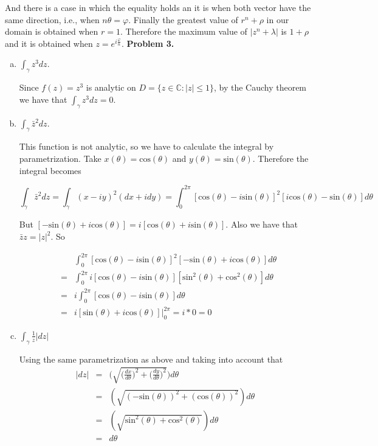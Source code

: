 \documentclass[letterpaper,twoside,11pt]{article}
\begin{document}
And there is a case in which the equality holds an it is when both vector have the same direction, i.e., when $n\theta=\varphi$. Finally the greatest value of $r^n+\rho$ in our domain is obtained when $r=1$. Therefore the maximum value of $|z^n+\lambda|$ is $1+\rho$ and it is obtained when $z=e^{i\frac{\varphi}{n}}$. 
\newpage
\textbf{Problem 3.}
\begin{enumerate}[a)]
\item $\int_{\gamma} z^3dz$. 

Since $f(z)=z^3$ is analytic on $D=\{z \in \mathbb{C}:|z|\leq 1\}$, by the Cauchy theorem we have that $\int_{\gamma} z^3dz = 0$.

\item $\int_{\gamma} \bar{z}^2dz$. 

This function is not analytic, so we have to calculate the integral by parametrization. Take $x(\theta)=\text{cos}(\theta)$ and $y(\theta)=\text{sin}(\theta)$. Therefore the integral becomes

\begin{equation}
\int_{\gamma} \bar{z}^2dz = \int_{\gamma} (x-iy)^2(dx+idy) = \int_{0}^{2\pi} [\text{cos}(\theta)-i\text{sin}(\theta)]^2[i\text{cos}(\theta)-\text{sin}(\theta)]d\theta \nonumber
\end{equation}

But $[-\text{sin}(\theta)+i\text{cos}(\theta)]=i[\text{cos}(\theta)+i\text{sin}(\theta)]$. Also we have that $\bar{z}z=|z|^2$. So

\begin{eqnarray}
&& \int_{0}^{2\pi} [\text{cos}(\theta)-i\text{sin}(\theta)]^2[-\text{sin}(\theta)+i\text{cos}(\theta)]d\theta \nonumber 
\\&=& \int_{0}^{2\pi} i[\text{cos}(\theta)-i\text{sin}(\theta)][\text{sin}^2(\theta)+\text{cos}^2(\theta)]d\theta \nonumber
\\&=& i\int_{0}^{2\pi} [\text{cos}(\theta)-i\text{sin}(\theta)]d\theta \nonumber 
\\&=& i[\text{sin}(\theta)+i\text{cos}(\theta)]\bigg\vert_0^{2\pi} =i*0=0\nonumber
\end{eqnarray}
\item $\int_{\gamma} \frac{1}{z}|dz|$

Using the same parametrization as above and taking into account that
\begin{eqnarray}
|dz|&=&\bigg(\sqrt{\Big(\frac{dx}{d\theta}\Big)^2+\Big(\frac{dy}{d\theta}\Big)^2}\bigg)d\theta \nonumber
\\&=& (\sqrt{(-\text{sin}(\theta))^2+(\text{cos}(\theta))^2})d\theta \nonumber
\\&=& (\sqrt{\text{sin}^2(\theta)+\text{cos}^2(\theta)})d\theta \nonumber
\\&=& d\theta \nonumber
\end{eqnarray}


\end{enumerate}
\end{document}
